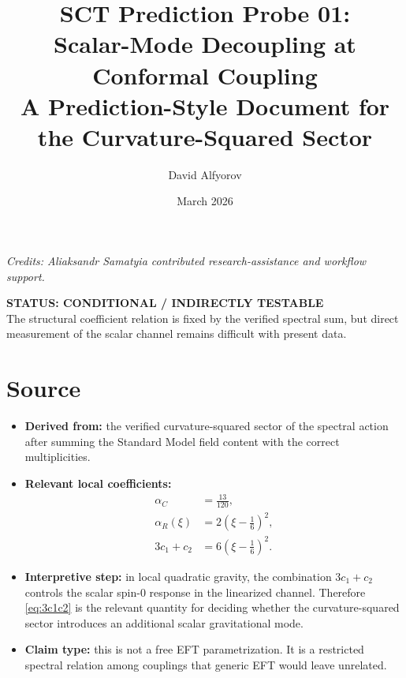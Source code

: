\documentclass[11pt,a4paper]{article}
\title{%
  \textbf{SCT Prediction Probe 01:}\\[6pt]
  \Large Scalar-Mode Decoupling at Conformal Coupling\\[4pt]
  \large A Prediction-Style Document for the Curvature-Squared Sector
}
\author{David Alfyorov}
\date{March 2026}
\begin{document}
\maketitle


\begin{center}
\small\textit{Credits: Aliaksandr Samatyia contributed research-assistance and workflow support.}
\end{center}

\begin{center}
  \colorbox{statusamber!15}{\parbox{0.68\textwidth}{\centering
    \textbf{\color{statusamber} STATUS: CONDITIONAL / INDIRECTLY TESTABLE}\\[2pt]
    \small The structural coefficient relation is fixed by the verified
    spectral sum, but direct measurement of the scalar channel remains
    difficult with present data.
  }}
\end{center}

\vspace{1em}

\section{Source}
\label{sec:source}

\begin{itemize}[leftmargin=2em]
  \item \textbf{Derived from:} the verified curvature-squared sector of the
  spectral action after summing the Standard Model field content with the
  correct multiplicities.
  \item \textbf{Relevant local coefficients:}
  \begin{align}
    \alpha_C &= \frac{13}{120},
    \label{eq:alphaC}\\[4pt]
    \alpha_R(\xi) &= 2\left(\xi - \frac{1}{6}\right)^2,
    \label{eq:alphaR}\\[4pt]
    3c_1 + c_2 &= 6\left(\xi - \frac{1}{6}\right)^2.
    \label{eq:3c1c2}
  \end{align}
  \item \textbf{Interpretive step:} in local quadratic gravity, the
  combination $3c_1 + c_2$ controls the scalar spin-0 response in the
  linearized channel.  Therefore \eqref{eq:3c1c2} is the relevant quantity
  for deciding whether the curvature-squared sector introduces an additional
  scalar gravitational mode.
  \item \textbf{Claim type:} this is not a free EFT parametrization.  It is a
  restricted spectral relation among couplings that generic EFT would leave
  unrelated.
\end{itemize}
\end{document}
